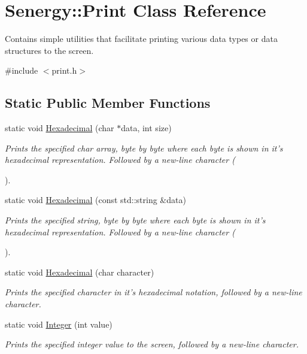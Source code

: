 \hypertarget{class_senergy_1_1_print}{\section{Senergy\-:\-:Print Class Reference}
\label{class_senergy_1_1_print}
}


Contains simple utilities that facilitate printing various data types or data structures to the screen.  




{\ttfamily \#include $<$print.\-h$>$}

\subsection*{Static Public Member Functions}
\begin{DoxyCompactItemize}
\item 
static void \hyperlink{class_senergy_1_1_print_a6c6b70bd91e56896058004bf82201010}{Hexadecimal} (char $\ast$data, int size)
\begin{DoxyCompactList}\small\item\em Prints the specified char array, byte by byte where each byte is shown in it's hexadecimal representation. Followed by a new-\/line character (\par
). \end{DoxyCompactList}\item 
static void \hyperlink{class_senergy_1_1_print_a28060c00de905d945667cf606f7ad1d6}{Hexadecimal} (const std\-::string \&data)
\begin{DoxyCompactList}\small\item\em Prints the specified string, byte by byte where each byte is shown in it's hexadecimal representation. Followed by a new-\/line character (\par
). \end{DoxyCompactList}\item 
static void \hyperlink{class_senergy_1_1_print_ac85fea5b673455bfc796d48c56fac38d}{Hexadecimal} (char character)
\begin{DoxyCompactList}\small\item\em Prints the specified character in it's hexadecimal notation, followed by a new-\/line character. \end{DoxyCompactList}\item 
static void \hyperlink{class_senergy_1_1_print_a7899dd50cdb0b0a6e7ed144d62ea227d}{Integer} (int value)
\begin{DoxyCompactList}\small\item\em Prints the specified integer value to the screen, followed by a new-\/line character. \end{DoxyCompactList}\item 

\end{DoxyCompactItemize}
